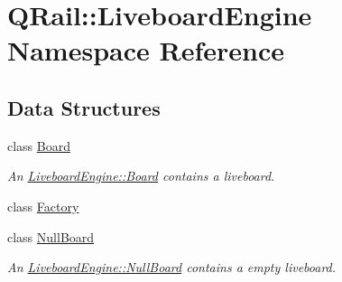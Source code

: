 \hypertarget{namespaceQRail_1_1LiveboardEngine}{}\section{Q\+Rail\+::Liveboard\+Engine Namespace Reference}
\label{namespaceQRail_1_1LiveboardEngine}
\subsection*{Data Structures}
\begin{DoxyCompactItemize}
\item 
class \mbox{\hyperlink{classQRail_1_1LiveboardEngine_1_1Board}{Board}}
\begin{DoxyCompactList}\small\item\em An \mbox{\hyperlink{classQRail_1_1LiveboardEngine_1_1Board}{Liveboard\+Engine\+::\+Board}} contains a liveboard. \end{DoxyCompactList}\item 
class \mbox{\hyperlink{classQRail_1_1LiveboardEngine_1_1Factory}{Factory}}
\item 
class \mbox{\hyperlink{classQRail_1_1LiveboardEngine_1_1NullBoard}{Null\+Board}}
\begin{DoxyCompactList}\small\item\em An \mbox{\hyperlink{classQRail_1_1LiveboardEngine_1_1NullBoard}{Liveboard\+Engine\+::\+Null\+Board}} contains a empty liveboard. \end{DoxyCompactList}\end{DoxyCompactItemize}
